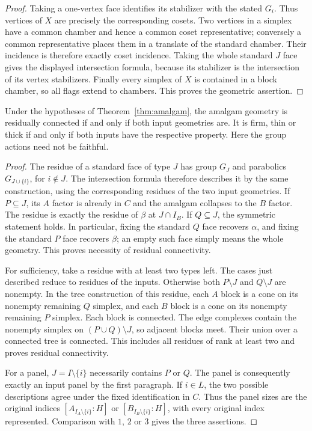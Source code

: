 \begin{proof}
Taking a one-vertex face identifies its stabilizer with the stated $G_i$.
Thus vertices of $X$ are precisely the corresponding cosets. Two vertices
in a simplex have a common chamber and hence a common coset representative;
conversely a common representative places them in a translate of the
standard chamber. Their incidence is therefore exactly coset incidence.
Taking the whole standard $J$ face gives the displayed intersection
formula, because its stabilizer is the intersection of its vertex
stabilizers. Finally every simplex of $X$ is contained in a block chamber,
so all flags extend to chambers. This proves the geometric assertion.
\end{proof}

\begin{corollary}\label{cor:residues}
Under the hypotheses of Theorem~\ref{thm:amalgam}, the amalgam geometry
is residually connected if and only if both input geometries are.
It is firm, thin or thick if and only if both inputs have the respective
property. Here the group actions need not be faithful.
\end{corollary}
\begin{proof}
The residue of a standard face of type $J$ has group $G_J$ and
parabolics $G_{J\cup\{i\}}$, for $i\notin J$. The intersection formula
therefore describes it by the same construction, using the corresponding
residues of the two input geometries. If $P\subseteq J$, its $A$ factor
is already in $C$ and the amalgam collapses to the $B$ factor. The
residue is exactly the residue of $\beta$ at $J\cap I_B$. If
$Q\subseteq J$, the symmetric statement holds. In particular, fixing
the standard $Q$ face recovers $\alpha$, and fixing the standard $P$
face recovers $\beta$; an empty such face simply means the whole geometry.
This proves necessity of residual connectivity.

For sufficiency, take a residue with at least two types left. The cases
just described reduce to residues of the inputs. Otherwise both
$P\setminus J$ and $Q\setminus J$ are nonempty. In the tree construction
of this residue, each $A$ block is a cone on its nonempty remaining
$Q$ simplex, and each $B$ block is a cone on its nonempty remaining
$P$ simplex. Each block is connected. The edge complexes contain the
nonempty simplex on $(P\cup Q)\setminus J$, so adjacent blocks meet.
Their union over a connected tree is connected. This includes all
residues of rank at least two and proves residual connectivity.

For a panel, $J=I\setminus\{i\}$ necessarily contains $P$ or $Q$.
The panel is consequently exactly an input panel by the first paragraph.
If $i\in L$, the two possible descriptions agree under the fixed
identification in $C$. Thus the panel sizes are the original indices
$[A_{I_A\setminus\{i\}}:H]$ or
$[B_{I_B\setminus\{i\}}:H]$, with every original index represented.
Comparison with $1$, $2$ or $3$ gives the three assertions.
\end{proof}

